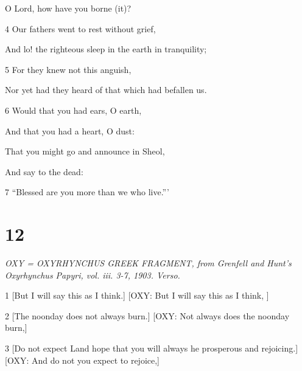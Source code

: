 \par O Lord, how have you borne (it)?

\par 4 Our fathers went to rest without grief,

\par And lo! the righteous sleep in the earth in tranquility;

\par 5 For they knew not this anguish,

\par Nor yet had they heard of that which had befallen us.

\par 6 Would that you had ears, O earth,

\par And that you had a heart, O dust:

\par That you might go and announce in Sheol,

\par And say to the dead:

\par 7 “Blessed are you more than we who live.”’

\chapter{12}

\par \textit{OXY = OXYRHYNCHUS GREEK FRAGMENT, from Grenfell and Hunt's Oxyrhynchus Papyri, vol. iii. 3-7, 1903. Verso.}

\par 1 [But I will say this as I think.] [OXY: But I will say this as I think, ]

\par [And I will speak against you, O land, which alt prospering.] [OXY: And speak against you, the land that is prospering.]

\par 2 [The noonday does not always burn.] [OXY: Not always does the noonday burn,]

\par [Nor do the rays of the sun constantly give light.] [OXY: Nor do the rays of the sun constantly give light.]

\par 3 [Do not expect Land hope that you will always he prosperous and rejoicing.] [OXY: And do not you expect to rejoice,]

